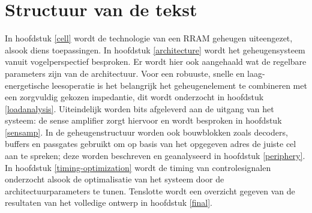 \section{Structuur van de tekst}
In hoofdstuk \ref{cell} wordt de technologie van een RRAM geheugen uiteengezet, alsook diens toepassingen. In hoofdstuk \ref{architecture} wordt het geheugensysteem vanuit vogelperspectief besproken. Er wordt hier ook aangehaald wat de regelbare parameters zijn van de architectuur. Voor een robuuste, snelle en laag-energetische leesoperatie is het belangrijk het geheugenelement te combineren met een zorgvuldig gekozen impedantie, dit wordt onderzocht in hoofdstuk \ref{loadanalysis}. Uiteindelijk worden bits afgeleverd aan de uitgang van het systeem: de sense amplifier zorgt hiervoor en wordt besproken in hoofdstuk \ref{sensamp}.
In de geheugenstructuur worden ook bouwblokken zoals decoders, buffers en passgates gebruikt om op basis van het opgegeven adres de juiste cel aan te spreken; deze worden beschreven en geanalyseerd in hoofdstuk \ref{periphery}.
In hoofdstuk \ref{timing-optimization} wordt de timing van controlesignalen onderzocht alsook de optimalisatie van het systeem door de architectuurparameters te tunen. Tenslotte wordt een overzicht gegeven van de resultaten van het volledige ontwerp in hoofdstuk \ref{final}.
